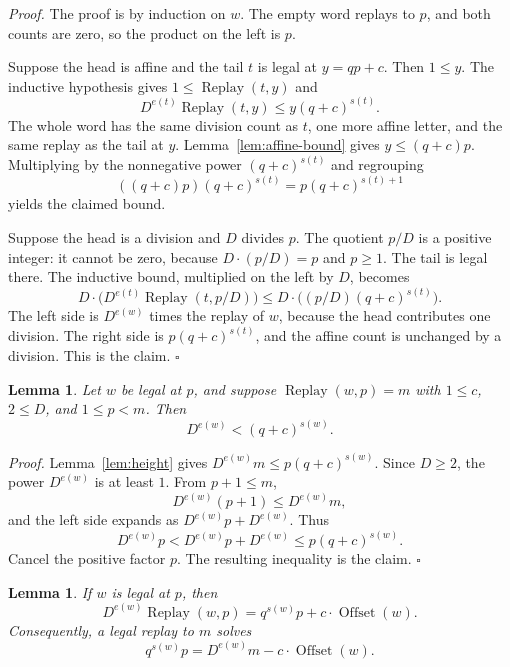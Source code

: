 \documentclass[11pt,letterpaper]{article}
\newtheorem{lemma}[theorem]{Lemma}
\newenvironment{proof}{\noindent\textit{Proof.}}{\hfill\(\square\)}
\begin{document}
\begin{proof}
The proof is by induction on \(w\). The empty word replays to \(p\), and both counts are zero, so the product on the left is \(p\).

Suppose the head is affine and the tail \(t\) is legal at \(y=qp+c\). Then \(1\le y\). The inductive hypothesis gives \(1\le\operatorname{Replay}(t,y)\) and
\[
D^{e(t)}\operatorname{Replay}(t,y)\le y(q+c)^{s(t)}.
\]
The whole word has the same division count as \(t\), one more affine letter, and the same replay as the tail at \(y\). Lemma~\ref{lem:affine-bound} gives \(y\le(q+c)p\). Multiplying by the nonnegative power \((q+c)^{s(t)}\) and regrouping
\[
((q+c)p)(q+c)^{s(t)}=p(q+c)^{s(t)+1}
\]
yields the claimed bound.

Suppose the head is a division and \(D\) divides \(p\). The quotient \(p/D\) is a positive integer: it cannot be zero, because \(D\cdot(p/D)=p\) and \(p\ge 1\). The tail is legal there. The inductive bound, multiplied on the left by \(D\), becomes
\[
D\cdot\bigl(D^{e(t)}\operatorname{Replay}(t,p/D)\bigr)\le D\cdot\bigl((p/D)(q+c)^{s(t)}\bigr).
\]
The left side is \(D^{e(w)}\) times the replay of \(w\), because the head contributes one division. The right side is \(p(q+c)^{s(t)}\), and the affine count is unchanged by a division. This is the claim.
\end{proof}

\begin{lemma}
\label{lem:gate}
Let \(w\) be legal at \(p\), and suppose \(\operatorname{Replay}(w,p)=m\) with \(1\le c\), \(2\le D\), and \(1\le p<m\). Then
\[
D^{e(w)}<(q+c)^{s(w)}.
\]
\end{lemma}

\begin{proof}
Lemma~\ref{lem:height} gives \(D^{e(w)}m\le p(q+c)^{s(w)}\). Since \(D\ge 2\), the power \(D^{e(w)}\) is at least \(1\). From \(p+1\le m\),
\[
D^{e(w)}(p+1)\le D^{e(w)}m,
\]
and the left side expands as \(D^{e(w)}p+D^{e(w)}\). Thus
\[
D^{e(w)}p<D^{e(w)}p+D^{e(w)}\le p(q+c)^{s(w)}.
\]
Cancel the positive factor \(p\). The resulting inequality is the claim.
\end{proof}

\begin{lemma}
\label{lem:offset}
If \(w\) is legal at \(p\), then
\[
D^{e(w)}\operatorname{Replay}(w,p)=q^{s(w)}p+c\cdot\operatorname{Offset}(w).
\]
Consequently, a legal replay to \(m\) solves
\[
q^{s(w)}p=D^{e(w)}m-c\cdot\operatorname{Offset}(w).
\]
\end{lemma}
\end{document}
